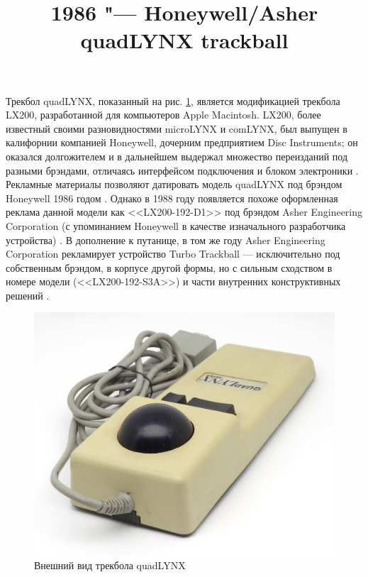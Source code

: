 \documentclass[11pt, a4paper]{article}
\begin{document}
\title{1986 "--- Honeywell/Asher quadLYNX trackball}
\date{}
\maketitle
{}
Трекбол quadLYNX, показанный на рис. \ref{fig:quadLYNXPic}, является модификацией трекбола LX200, разработанной для компьютеров Apple Macintosh. LX200, более известный своими разновидностями microLYNX и comLYNX, был выпущен в калифорнии компанией Honeywell, дочерним предприятием Disc Instruments; он оказался долгожителем и в дальнейшем выдержал множество переизданий под разными брэндами, отличаясь интерфейсом подключения и блоком электроники \cite{lx200}. Рекламные материалы позволяют датировать модель quadLYNX под брэндом Honeywell 1986 годом \cite{honeywell}. Однако в 1988 году появляется похоже оформленная реклама данной модели как <<LX200-192-D1>> под брэндом Asher Engineering Corporation (с упоминанием Honeywell в качестве изначального разработчика устройства) \cite{asher}. В дополнение к путанице, в том же году Asher Engineering Corporation рекламирует устройство Turbo Trackball --- исключительно под собственным брэндом, в корпусе другой формы, но с сильным сходством в номере модели (<<LX200-192-S3A>>) и части внутренних конструктивных решений \cite{turbo}.

\begin{figure}[h]
    \centering
    \includegraphics[scale=0.75]{1986_honeywell_asher_quadlynx_trackball/pic_30.jpg}
    \caption{Внешний вид трекбола quadLYNX}
    \label{fig:quadLYNXPic}
\end{figure}
\end{document}
